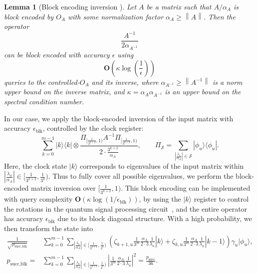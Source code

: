 \documentclass[letterpaper,onecolumn,11pt,accepted=2026-02-14]{quantumarticle}
\newcommand{\abs}[1]{\left\lvert#1\right\rvert}
\newcommand{\norm}[1]{\left\lVert#1\right\rVert}
\newtheorem{lemma}{Lemma}
\theoremstyle{remark}
\theoremstyle{plain}
\newcommand{\ket}[1]{|#1\rangle}
\newcommand{\bra}[1]{\langle#1|}
\newcommand{\ketbra}[2]{\ket{#1}\!\bra{#2}}
\begin{document}
\begin{lemma}[Block encoding inversion {\cite[Corollary 69]{Gilyen2018singular}}]
\label{lem:inv_block}
     Let $A$ be a matrix such that $A/\alpha_A$ is block encoded by $O_A$ with some normalization factor $\alpha_A\geq\norm{A}$.
     Then the operator
     \begin{equation}
         \frac{A^{-1}}{2\alpha_{A^{-1}}}
     \end{equation}
     can be block encoded with accuracy $\epsilon$ using
     \begin{equation}
        \mathbf{O}\left(\kappa\log\left(\frac{1}{\epsilon}\right)\right)
    \end{equation}
    queries to the controlled-$O_A$ and its inverse, where $\alpha_{A^{-1}}\geq\norm{A^{-1}}$ is a norm upper bound on the inverse matrix, and $\kappa=\alpha_A\alpha_{A^{-1}}$ is an upper bound on the spectral condition number.
\end{lemma}
In our case, we apply the block-encoded inversion of the input matrix with accuracy $\epsilon_{\text{blk}}$, controlled by the clock register:
\begin{equation}
    \sum_{k=0}^{m-1}\ketbra{k}{k}\otimes\frac{\Pi_{[\frac{1}{3^{k+2}},1)}A^{-1}\Pi_{[\frac{1}{3^{k+2}},1)}}{2\cdot \frac{3^{k+2}}{\alpha_A}},\qquad
    \Pi_{\mathcal{S}}=\sum_{\abs{\frac{\lambda_u}{\alpha_A}}\in\mathcal{S}}\ketbra{\phi_u}{\phi_u}.
\end{equation}
Here, the clock state $\ket{k}$ corresponds to eigenvalues of the input matrix within $\abs{\frac{\lambda_u}{\alpha_A}}\in[\frac{1}{3^{k+2}},\frac{1}{3^k})$. Thus to fully cover all possible eigenvalues, we perform the block-encoded matrix inversion over $[\frac{1}{3^{k+2}},1)$. 
This block encoding can be implemented with query complexity $\mathbf{O}\left(\kappa\log(1/\epsilon_{\text{blk}})\right)$, by using the $\ket{k}$ register to control the rotations in the quantum signal processing circuit~\cite{Low2016HamSim}, and the entire operator has accuracy $\epsilon_{\text{blk}}$ due to its block diagonal structure.
With a high probability, we then transform the state into
\begin{equation}
\begin{aligned}
    \frac{1}{\sqrt{p_{\text{succ,blk}}}}&\sum_{k=0}^{m-1}\sum_{\abs{\frac{\lambda_u}{\alpha_A}}\in\big[\frac{1}{3^{k+1}},\frac{1}{3^k}\big)}
    \left(\zeta_{k+1,u}\frac{1}{3^m}
    \frac{\alpha_A}{2\cdot3}
    \frac{1}{\lambda_u}
    \ket{k}
    +\zeta_{k,u}\frac{1}{3^m}
    \frac{\alpha_A}{2\cdot3}
    \frac{1}{\lambda_u}
    \ket{k-1}\right)
    \gamma_u\ket{\phi_u},\\
    p_{\text{succ,blk}}=&\sum_{k=0}^{m-1}\sum_{\abs{\frac{\lambda_u}{\alpha_A}}\in\big[\frac{1}{3^{k+1}},\frac{1}{3^k}\big)}\abs{\frac{1}{3^m}
    \frac{\alpha_A}{2\cdot3}
    \frac{1}{\lambda_u}}^2
    =\frac{p_{\text{succ}}}{36}.
\end{aligned}
\end{equation}
\end{document}
